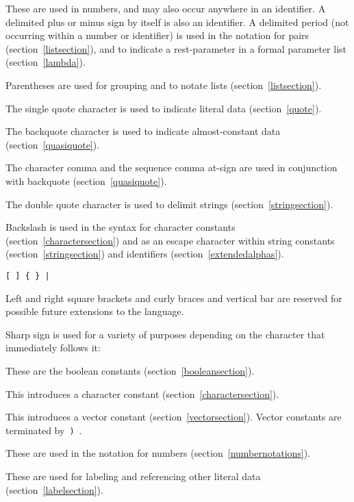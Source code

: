 \begin{description}{}{}

\item[{\tt.\ + -}]
These are used in numbers, and may also occur anywhere in an identifier.
A delimited plus or minus sign by itself
is also an identifier.
A delimited period (not occurring within a number or identifier) is used
in the notation for pairs (section~\ref{listsection}), and to indicate a
rest-parameter in a  formal parameter list (section~\ref{lambda}).

\item[\tt( )]
Parentheses are used for grouping and to notate lists
(section~\ref{listsection}).

\item[\singlequote]
The single quote character is used to indicate literal data (section~\ref{quote}).

\item[\backquote]
The backquote character is used to indicate almost-constant
data (section~\ref{quasiquote}).

\item[\tt, ,@]
The character comma and the sequence comma at-sign are used in conjunction
with backquote (section~\ref{quasiquote}).

\item[\tt"]
The double quote character is used to delimit strings (section~\ref{stringsection}).

\item[\backwhack]
Backslash is used in the syntax for character constants
(section~\ref{charactersection}) and as an escape character within string
constants (section~\ref{stringsection}) and identifiers
(section~\ref{extendedalphas}).

\hbox{\tt \verb"[" \verb"]" \verb"{" \verb"}" \verb"|"}
\item[\copy0]
Left and right square brackets and curly braces and vertical bar
are reserved for possible future extensions to the language.

\item[\sharpsign] Sharp sign is used for a variety of purposes depending on
the character that immediately follows it:

\item[\schtrue{} \schfalse{}]
These are the boolean constants (section~\ref{booleansection}).

\item[\sharpsign\backwhack]
This introduces a character constant (section~\ref{charactersection}).

\item[\sharpsign\tt(]
This introduces a vector constant (section~\ref{vectorsection}).  Vector constants
are terminated by~{\tt)}~.

\item[{\tt\#e \#i \#b \#o \#d \#x}]
These are used in the notation for numbers (section~\ref{numbernotations}).

\item[\hyper{digit}]
These are used for labeling and referencing other literal data (section~\ref{labelsection}).

\end{description}
